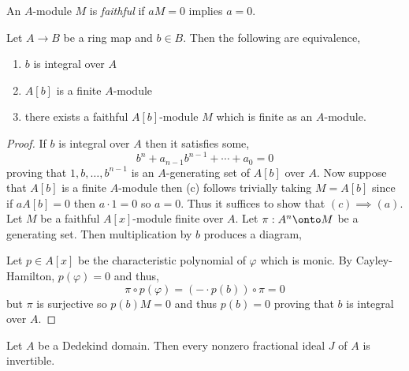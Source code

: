 \documentclass[12pt]{article}
\begin{document}
\begin{defn}
An $A$-module $M$ is \textit{faithful} if $aM = 0$ implies $a = 0$. 
\end{defn}

\begin{lemma}
Let $A \to B$ be a ring map and $b \in B$. Then the following are equivalence,
\begin{enumerate}
\item $b$ is integral over $A$
\item $A[b]$ is a finite $A$-module
\item there exists a faithful $A[b]$-module $M$ which is finite as an $A$-module.
\end{enumerate}
\end{lemma}

\begin{proof}
If $b$ is integral over $A$ then it satisfies some,
\[ b^n + a_{n-1} b^{n-1} + \cdots + a_{0} = 0 \]
proving that $1, b, \dots, b^{n-1}$ is an $A$-generating set of $A[b]$ over $A$. Now suppose that $A[b]$ is a finite $A$-module then (c) follows trivially taking $M = A[b]$ since if $a A[b] = 0$ then $a \cdot 1 = 0$ so $a = 0$. Thus it suffices to show that $(c) \implies (a)$. 
\bigskip\\
Let $M$ be a faithful $A[x]$-module finite over $A$. Let $\pi : A^n \onto M$ be a generating set. Then multiplication by $b$ produces a diagram,
\begin{center}
\end{center}
Let $p \in A[x]$ be the characteristic polynomial of $\varphi$ which is monic. By Cayley-Hamilton, $p(\varphi) = 0$ and thus,
\[ \pi \circ p(\varphi) = (- \cdot p(b)) \circ \pi = 0 \]
but $\pi$ is surjective so $p(b) M = 0$ and thus $p(b) = 0$ proving that $b$ is integral over $A$.
\end{proof}

\begin{prop}
Let $A$ be a Dedekind domain. Then every nonzero fractional ideal $J$ of $A$ is invertible.
\end{prop}
\end{document}
